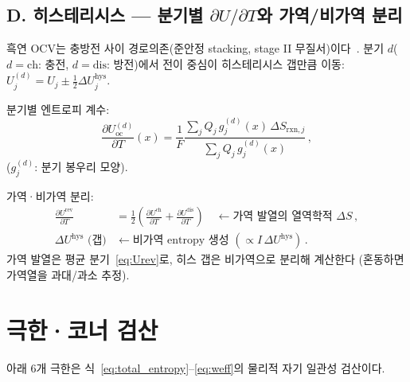 \documentclass[11pt,a4paper]{article}
\newcommand{\rxn}{\mathrm{rxn}}
\newcommand{\rev}{\mathrm{rev}}
\newcommand{\oc}{\mathrm{oc}}
\begin{document}
\subsection{D. 히스테리시스 --- 분기별 $\partial U/\partial T$와 가역/비가역 분리}\label{sec:mixing_D}

흑연 OCV는 충방전 사이 경로의존(준안정 stacking, stage II 무질서)이다~\cite{hysteresis2018}.
분기 $d$($d=\mathrm{ch}$: 충전, $d=\mathrm{dis}$: 방전)에서 전이 중심이 히스테리시스 갭만큼 이동:
$U_j^{(d)}=U_j\pm\frac{1}{2}\Delta U_j^{\mathrm{hys}}$.

분기별 엔트로피 계수:
\begin{equation}
  \frac{\partial U_{\oc}^{(d)}}{\partial T}(x)
    =\frac{1}{F}\frac{\sum_j Q_j\,g_j^{(d)}(x)\,\Delta S_{\rxn,j}}
      {\sum_j Q_j\,g_j^{(d)}(x)}\,,
  \label{eq:hys_branches}
\end{equation}
($g_j^{(d)}$: 분기 봉우리 모양).

가역·비가역 분리:
\begin{align}
  \frac{\partial U^{\rev}}{\partial T}
    &=\frac{1}{2}\!\left(\frac{\partial U^{\mathrm{ch}}}{\partial T}
      +\frac{\partial U^{\mathrm{dis}}}{\partial T}\right)
    \quad\leftarrow\text{가역 발열의 열역학적 }\Delta S\,,
  \label{eq:Urev}\\
  \Delta U^{\mathrm{hys}} \text{ (갭)}
    &\leftarrow\text{비가역 entropy 생성 }(\propto I\,\Delta U^{\mathrm{hys}})\,.
  \label{eq:Uirrev}
\end{align}
가역 발열은 평균 분기~\eqref{eq:Urev}로, 히스 갭은 비가역으로 분리해 계산한다
(혼동하면 가역열을 과대/과소 추정).

\section{극한·코너 검산}\label{sec:limits}

아래 6개 극한은 식~\eqref{eq:total_entropy}--\eqref{eq:weff}의 물리적 자기 일관성 검산이다.
\end{document}

